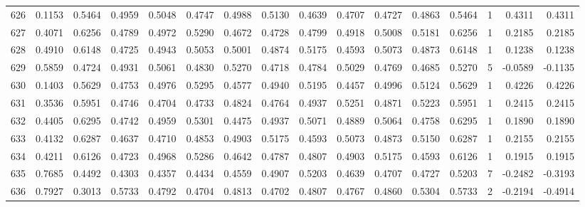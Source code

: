 \begin{tabular}{lrrrrrrrrrrrrrrr}
626 &      0.1153 &  0.5464 &  0.4959 &  0.5048 &  0.4747 &  0.4988 &  0.5130 &  0.4639 &  0.4707 &  0.4727 &   0.4863 &     0.5464 &      1 &                    0.4311 &                     0.4311 \\
627 &      0.4071 &  0.6256 &  0.4789 &  0.4972 &  0.5290 &  0.4672 &  0.4728 &  0.4799 &  0.4918 &  0.5008 &   0.5181 &     0.6256 &      1 &                    0.2185 &                     0.2185 \\
628 &      0.4910 &  0.6148 &  0.4725 &  0.4943 &  0.5053 &  0.5001 &  0.4874 &  0.5175 &  0.4593 &  0.5073 &   0.4873 &     0.6148 &      1 &                    0.1238 &                     0.1238 \\
629 &      0.5859 &  0.4724 &  0.4931 &  0.5061 &  0.4830 &  0.5270 &  0.4718 &  0.4784 &  0.5029 &  0.4769 &   0.4685 &     0.5270 &      5 &                   -0.0589 &                    -0.1135 \\
630 &      0.1403 &  0.5629 &  0.4753 &  0.4976 &  0.5295 &  0.4577 &  0.4940 &  0.5195 &  0.4457 &  0.4996 &   0.5124 &     0.5629 &      1 &                    0.4226 &                     0.4226 \\
631 &      0.3536 &  0.5951 &  0.4746 &  0.4704 &  0.4733 &  0.4824 &  0.4764 &  0.4937 &  0.5251 &  0.4871 &   0.5223 &     0.5951 &      1 &                    0.2415 &                     0.2415 \\
632 &      0.4405 &  0.6295 &  0.4742 &  0.4959 &  0.5301 &  0.4475 &  0.4937 &  0.5071 &  0.4889 &  0.5064 &   0.4758 &     0.6295 &      1 &                    0.1890 &                     0.1890 \\
633 &      0.4132 &  0.6287 &  0.4637 &  0.4710 &  0.4853 &  0.4903 &  0.5175 &  0.4593 &  0.5073 &  0.4873 &   0.5150 &     0.6287 &      1 &                    0.2155 &                     0.2155 \\
634 &      0.4211 &  0.6126 &  0.4723 &  0.4968 &  0.5286 &  0.4642 &  0.4787 &  0.4807 &  0.4903 &  0.5175 &   0.4593 &     0.6126 &      1 &                    0.1915 &                     0.1915 \\
635 &      0.7685 &  0.4492 &  0.4303 &  0.4357 &  0.4434 &  0.4559 &  0.4907 &  0.5203 &  0.4639 &  0.4707 &   0.4727 &     0.5203 &      7 &                   -0.2482 &                    -0.3193 \\
636 &      0.7927 &  0.3013 &  0.5733 &  0.4792 &  0.4704 &  0.4813 &  0.4702 &  0.4807 &  0.4767 &  0.4860 &   0.5304 &     0.5733 &      2 &                   -0.2194 &                    -0.4914 \\

\end{tabular}
